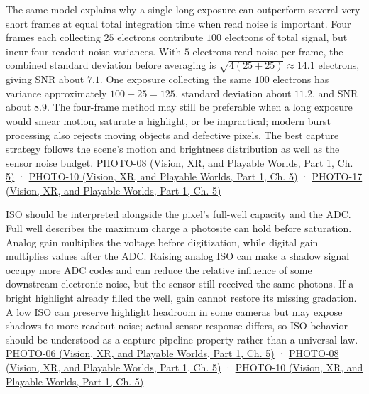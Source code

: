 The same model explains why a single long exposure can outperform several very short frames at equal total integration time when read noise is important. Four frames each collecting \(25\) electrons contribute \(100\) electrons of total signal, but incur four readout-noise variances. With \(5\) electrons read noise per frame, the combined standard deviation before averaging is \(\sqrt{4(25+25)}\approx14.1\) electrons, giving SNR about \(7.1\). One exposure collecting the same \(100\) electrons has variance approximately \(100+25=125\), standard deviation about \(11.2\), and SNR about \(8.9\). The four-frame method may still be preferable when a long exposure would smear motion, saturate a highlight, or be impractical; modern burst processing also rejects moving objects and defective pixels. The best capture strategy follows the scene's motion and brightness distribution as well as the sensor noise budget. \href{../07-Vision-XR-and-Playable-Worlds-P01/main.pdf\#nameddest=04-visual-computing-ii-ch036-photo-08---photography-session-08}{PHOTO-08 (Vision, XR, and Playable Worlds, Part 1, Ch. 5)} · \href{../07-Vision-XR-and-Playable-Worlds-P01/main.pdf\#nameddest=04-visual-computing-ii-ch036-photo-10---photography-session-10}{PHOTO-10 (Vision, XR, and Playable Worlds, Part 1, Ch. 5)} · \href{../07-Vision-XR-and-Playable-Worlds-P01/main.pdf\#nameddest=04-visual-computing-ii-ch036-photo-17---photography-session-17}{PHOTO-17 (Vision, XR, and Playable Worlds, Part 1, Ch. 5)}

ISO should be interpreted alongside the pixel's full-well capacity and the ADC. Full well describes the maximum charge a photosite can hold before saturation. Analog gain multiplies the voltage before digitization, while digital gain multiplies values after the ADC. Raising analog ISO can make a shadow signal occupy more ADC codes and can reduce the relative influence of some downstream electronic noise, but the sensor still received the same photons. If a bright highlight already filled the well, gain cannot restore its missing gradation. A low ISO can preserve highlight headroom in some cameras but may expose shadows to more readout noise; actual sensor response differs, so ISO behavior should be understood as a capture-pipeline property rather than a universal law. \href{../07-Vision-XR-and-Playable-Worlds-P01/main.pdf\#nameddest=04-visual-computing-ii-ch036-photo-06---photography-session-06}{PHOTO-06 (Vision, XR, and Playable Worlds, Part 1, Ch. 5)} · \href{../07-Vision-XR-and-Playable-Worlds-P01/main.pdf\#nameddest=04-visual-computing-ii-ch036-photo-08---photography-session-08}{PHOTO-08 (Vision, XR, and Playable Worlds, Part 1, Ch. 5)} · \href{../07-Vision-XR-and-Playable-Worlds-P01/main.pdf\#nameddest=04-visual-computing-ii-ch036-photo-10---photography-session-10}{PHOTO-10 (Vision, XR, and Playable Worlds, Part 1, Ch. 5)}

